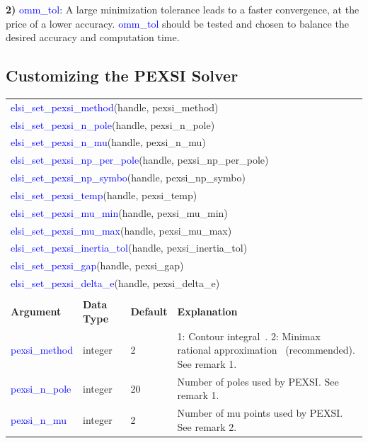 \documentclass{report}
\newcommand{\tcb}[1]{\textcolor{blue}{#1}}
\begin{document}
\textbf{2)} \tcb{omm\_tol}: A large minimization tolerance leads to a faster convergence, at the price of a lower accuracy. \tcb{omm\_tol} should be tested and chosen to balance the desired accuracy and computation time.

\subsection{Customizing the PEXSI Solver}
\label{subsec:setter_pexsi}
\begin{tabular}[]{|p{30mm}|p{20mm}|p{15mm}|p{100mm}|}
\multicolumn{4}{l}{\tcb{elsi\_set\_pexsi\_method}(handle, pexsi\_method)}\\
\multicolumn{4}{l}{\tcb{elsi\_set\_pexsi\_n\_pole}(handle, pexsi\_n\_pole)}\\
\multicolumn{4}{l}{\tcb{elsi\_set\_pexsi\_n\_mu}(handle, pexsi\_n\_mu)}\\
\multicolumn{4}{l}{\tcb{elsi\_set\_pexsi\_np\_per\_pole}(handle, pexsi\_np\_per\_pole)}\\
\multicolumn{4}{l}{\tcb{elsi\_set\_pexsi\_np\_symbo}(handle, pexsi\_np\_symbo)}\\
\multicolumn{4}{l}{\tcb{elsi\_set\_pexsi\_temp}(handle, pexsi\_temp)}\\
\multicolumn{4}{l}{\tcb{elsi\_set\_pexsi\_mu\_min}(handle, pexsi\_mu\_min)}\\
\multicolumn{4}{l}{\tcb{elsi\_set\_pexsi\_mu\_max}(handle, pexsi\_mu\_max)}\\
\multicolumn{4}{l}{\tcb{elsi\_set\_pexsi\_inertia\_tol}(handle, pexsi\_inertia\_tol)}\\
\multicolumn{4}{l}{\tcb{elsi\_set\_pexsi\_gap}(handle, pexsi\_gap)}\\
\multicolumn{4}{l}{\tcb{elsi\_set\_pexsi\_delta\_e}(handle, pexsi\_delta\_e)}\\
\multicolumn{4}{l}{}\\
\hline
\multicolumn{1}{|l|}{\textbf{Argument}} & \multicolumn{1}{l|}{\textbf{Data Type}} & \multicolumn{1}{l|}{\textbf{Default}} & \multicolumn{1}{l|}{\textbf{Explanation}}\\
\hline
\tcb{pexsi\_method}        & integer     & 2     & 1: Contour integral~\cite{pexsi_lin_2013}. 2: Minimax rational approximation~\cite{pole_moussa_2016} (recommended). See remark 1.\\
\hline
\tcb{pexsi\_n\_pole}       & integer     & 20    & Number of poles used by PEXSI. See remark 1.\\
\hline
\tcb{pexsi\_n\_mu}         & integer     & 2     & Number of mu points used by PEXSI. See remark 2.\\

\end{tabular}
\end{document}
